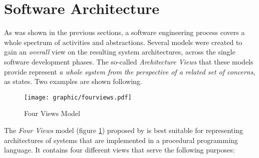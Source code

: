%
%
%
%
%
%
%

\section{Software Architecture}
\label{software_architecture_heading}

As was shown in the previous sections, a software engineering process covers a
whole spectrum of activities and abstractions. Several models were created to gain
an \emph{overall} view on the resulting system architectures, across the single
software development phases. The so-called \emph{Architecture Views} that these
models provide represent \textit{a whole system from the perspective of a related
set of concerns}, as \cite{ieee1471-2000} states. Two examples are shown following.

\begin{figure}[ht]
    \begin{center}
        \texttt{[image: graphic/fourviews.pdf]}
        \caption{Four Views Model \cite{hofmeister}}
        \label{fourviews_figure}
    \end{center}
\end{figure}

The \emph{Four Views} model (figure \ref{fourviews_figure}) proposed by
\cite{hofmeister} is best suitable for representing architectures of systems that
are implemented in a procedural programming language. It contains four different
views that serve the following purposes:

